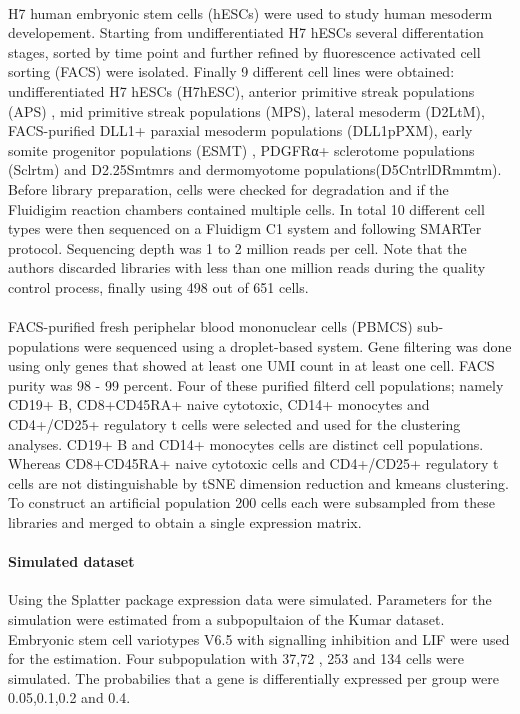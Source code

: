 \documentclass[11pt, a4paper]{article}\usepackage[]{graphicx}\usepackage[]{color}
\begin{document}
\paragraph{\citet{koh2016atlas} }
H7 human embryonic stem cells (hESCs) were used to study human mesoderm developement. Starting from undifferentiated H7 hESCs several differentation stages, sorted by time point and further refined by fluorescence activated cell sorting (FACS) were isolated. Finally 9 different cell lines were obtained:  undifferentiated H7 hESCs (H7hESC), anterior primitive streak populations (APS) , mid primitive streak populations (MPS), lateral mesoderm (D2LtM), FACS-purified DLL1+ paraxial mesoderm populations (DLL1pPXM), early somite progenitor populations (ESMT) , PDGFRα+ sclerotome populations (Sclrtm) and D2.25Smtmrs and dermomyotome populations(D5CntrlDRmmtm).
Before library preparation, cells were checked for degradation and if the Fluidigim reaction chambers contained multiple cells. In total 10 different cell types were then sequenced on a Fluidigm C1 system and following  SMARTer protocol. Sequencing depth was 1 to 2 million reads per cell. 
Note that the authors discarded libraries with less than one million reads during the quality control process, finally using 498 out of 651 cells.

\paragraph{ \citet{zheng2017massively}}
FACS-purified fresh periphelar blood mononuclear cells (PBMCS) sub-populations were sequenced using a droplet-based system. Gene filtering was done using only genes that showed at least one UMI count in at least one cell. FACS purity was 98 - 99 percent. Four of these purified filterd cell populations; namely CD19+ B, CD8+CD45RA+ naive cytotoxic, CD14+ monocytes and CD4+/CD25+ regulatory t cells were selected and used for the clustering analyses. CD19+ B and  CD14+ monocytes cells are distinct cell populations. Whereas CD8+CD45RA+ naive cytotoxic cells and  CD4+/CD25+ regulatory t cells are not distinguishable by tSNE dimension reduction and kmeans clustering.
To construct an artificial population 200 cells each were subsampled from these libraries and merged to obtain a single expression matrix.

\paragraph{Simulated dataset }
Using the Splatter package \citep{oshlack2017splatter} expression data were simulated. Parameters for the simulation were estimated from a subpopultaion of the Kumar dataset.  Embryonic stem cell variotypes V6.5 with signalling inhibition and LIF  were used for the estimation.  Four subpopulation with  37,72 ,  253 and 134 cells were simulated. The probabilies that a gene is differentially expressed per group were 0.05,0.1,0.2 and 0.4. 
\end{document}
